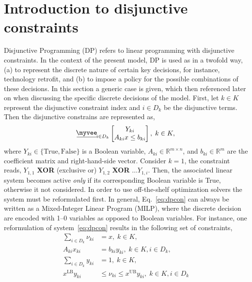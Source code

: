 \documentclass{amsbook}
\newcommand{\myveebar}{\mathbin{\vcenter{\hbox{$ \underline{\mkern-2.4mu{\myvee}\mkern-2.4mu} $}}}}
\begin{document}
\section{Introduction to disjunctive constraints}\label{sec:DP}
%
Disjunctive Programming (DP) refers to linear programming with disjunctive
constraints. In the context of the present model, DP is used as in a twofold
way, (a) to represent the discrete nature of certain key decisions, for
instance, technology retrofit, and (b) to impose a policy for the possible
combinations of these decisions.  In this section a generic case is given, which
then referenced later on when discussing the specific discrete decisions of the
model. First, let $k\in K$ represent the disjunctive constraint index and $i\in
D_k$ be the disjunctive terms. Then the disjunctive constrains are represented
as,
%
\begin{equation}\label{eq:dpcon}
    \myveebar_{i \in D_k}
    \begin{bmatrix}
        Y_{ki} \\
        A_{ki} x \leq b_{ki}
    \end{bmatrix}, \; k\in K,
\end{equation}
%
where $Y_{ki}\in\{\text{True}, \text{False}\}$ is a Boolean variable, $A_{ki}\in
\mathbb{R}^{m\times n}$, and $b_{ki}\in \mathbb{R}^{m}$ are the coefficient
matrix and right-hand-side vector. Consider $k=1$, the constraint reads,
$Y_{1,1}$ \textbf{XOR} (exclusive or) $Y_{1,2}$ \textbf{XOR} $\dots Y_{1,i}$. 
Then, the associated linear system becomes active \emph{only} if its
corresponding Boolean variable is True, otherwise it not considered.
%
In order to use off-the-shelf optimization solvers the system must be
reformulated first. In general, Eq.~\eqref{eq:dpcon} can always be written as a
Mixed-Integer Linear Program (MILP), where the discrete decision are encoded
with 1--0 variables as opposed to Boolean variables.  For instance, one
reformulation of system~\eqref{eq:dpcon} results in the following set of
constraints,
%
\begin{equation}\label{eq:convex_hull}
    \begin{split}
        \sum_{i\in D_k} \nu_{ki} &= x, \; k\in K, \\
        A_{ki} x_{ki} &= b_{ki} y_{ki}, \; k\in K, i\in D_k, \\
        \sum_{i\in D_k} y_{ki} &= 1, \; k\in K, \\
        x^{\text{LB}}y_{ki} &\leq \nu_{ki} \leq x^{\text{UB}}y_{ki},
        \; k\in K, i\in D_k\\
    \end{split}
\end{equation}
\end{document}
